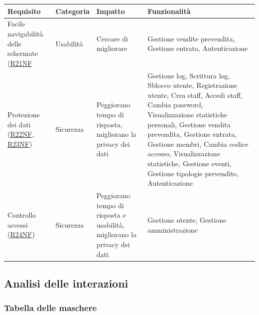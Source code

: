 \documentclass[a4paper]{article}
\begin{document}
\begin{center}
    \begin{tabularx}{1\textwidth}{|X|l|X|X|}
    \hline
    \textbf{Requisito} & \textbf{Categoria} & \textbf{Impatto} & \textbf{Funzionalità}\\
    \hline
    \hline
    Facile navigabilità delle schermate (\hyperlink{R21NF}{R21NF} & Usabilità & Cercare di migliorare & Gestione vendite prevendita,  Gestione entrata, Autenticazione\\
    \hline
    Protezione dei dati (\hyperlink{R22NF}{R22NF}, \hyperlink{R23NF}{R23NF}) & Sicurezza & Peggiorano tempo di risposta, migliorano la privacy dei dati & Gestione log, Scrittura log, Sblocco utente, Registrazione utente, Crea staff, Accedi staff, Cambia password, Visualizzazione statistiche personali, Gestione vendita prevendita, Gestione entrata, Gestione membri, Cambia codice accesso, Visualizzazione statistiche, Gestione eventi, Gestione tipologie prevendite, Autenticazione\\
    \hline
    Controllo accessi (\hyperlink{R24NF}{R24NF}) & Sicurezza & Peggiorano tempo di risposta e usabilità, migliorano la privacy dei dati & Gestione utente, Gestione amministrazione\\
    \hline
    \end{tabularx}
\end{center}

\newpage

\subsection{Analisi delle interazioni}
\subsubsection{Tabella delle maschere}
\end{document}
